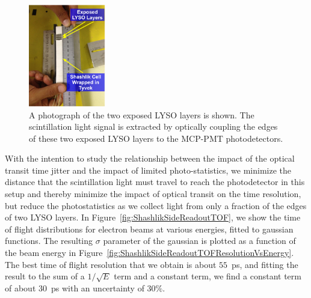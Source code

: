 \documentclass[12pt]{article}
\begin{document}
\begin{figure}[h] \centering
\includegraphics[width=0.30\textwidth]{figs/ShashlikSideReadoutPhotoA} 
\caption{ A photograph of the two exposed LYSO layers is shown.
The scintillation light signal is extracted by optically coupling
the edges of these two exposed LYSO layers to the MCP-PMT
photodetectors. } 
\label{fig:ShashlikSideReadoutExposedLayersPhoto}
\end{figure}

With the intention to study the relationship between the impact of the 
optical transit time jitter and the impact of limited photo-statistics,
we minimize the distance that the scintillation light
must travel to reach the photodetector in this setup and thereby minimize the
impact of optical transit on the time resolution, but reduce the photostatistics 
as we collect light from only a fraction of the edges of two LYSO layers. 
In Figure~\ref{fig:ShashlikSideReadoutTOF}, we show the 
time of flight distributions for electron beams at various energies, 
fitted to gaussian functions. The resulting
$\sigma$ parameter of the gaussian is plotted as a function of the
beam energy in Figure~\ref{fig:ShashlikSideReadoutTOFResolutionVsEnergy}.
The best time of flight resolution that we obtain is about $55$~ps, and
fitting the result to the sum of a $1/\sqrt{E}$ term and a constant term,
we find a constant term of about $30$~ps with an uncertainty of $30\%$. 
\end{document}

